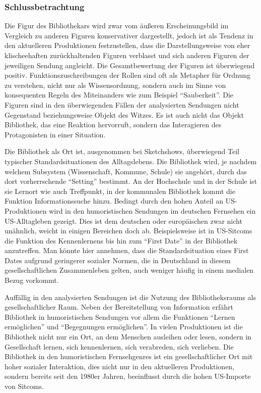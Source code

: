\subsubsection{Schlussbetrachtung}\label{schlussbetrachtung}

Die Figur des Bibliothekars wird zwar vom äußeren Erscheinungsbild im
Vergleich zu anderen Figuren konservativer dargestellt, jedoch ist als
Tendenz in den aktuelleren Produktionen festzustellen, dass die
Darstellungsweise von eher klischeehaften zurückhaltenden Figuren
verblasst und sich anderen Figuren der jeweiligen Sendung angleicht. Die
Gesamtbewertung der Figuren ist überwiegend positiv.
Funktionszuschreibungen der Rollen sind oft als Metapher für Ordnung zu
verstehen, nicht nur als Wissensordnung, sondern auch im Sinne von
konsequenten Regeln des Miteinanders wie zum Beispiel
\enquote{Sauberkeit}. Die Figuren sind in den überwiegenden Fällen der
analysierten Sendungen nicht Gegenstand beziehungsweise Objekt des
Witzes. Es ist auch nicht das Objekt Bibliothek, das eine Reaktion
hervorruft, sondern das Interagieren des Protagonisten in einer
Situation.

Die Bibliothek als Ort ist, ausgenommen bei Sketchshows, überwiegend
Teil typischer Standardsituationen des Alltagslebens. Die Bibliothek
wird, je nachdem welchem Subsystem (Wissenschaft, Kommune, Schule) sie
angehört, durch das dort vorherrschende \enquote{Setting} bestimmt. An
der Hochschule und in der Schule ist sie Lernort wie auch Treffpunkt, in
der kommunalen Bibliothek kommt die Funktion Informationssuche hinzu.
Bedingt durch den hohen Anteil an US-Produktionen wird in den
humoristischen Sendungen im deutschen Fernsehen ein US-Alltagleben
gezeigt. Dies ist dem deutschen oder europäischen zwar nicht unähnlich,
weicht in einigen Bereichen doch ab. Beispielsweise ist in US-Sitcoms
die Funktion des Kennenlernens bis hin zum \enquote{First Date} in der
Bibliothek anzutreffen. Man könnte hier annehmen, dass die
Standardsituation eines First Dates aufgrund geringerer
sozialer Normen, die in Deutschland in diesem gesellschaftlichen
Zusammenleben gelten, auch weniger häufig in einem medialen Bezug
vorkommt.

Auffällig in den analysierten Sendungen ist die Nutzung des
Bibliotheksraums als gesellschaftlicher Raum. Neben der Bereitstellung
von Information erfährt Bibliothek in humoristischen Sendungen vor allem
die Funktionen \enquote{Lernen ermöglichen} und \enquote{Begegnungen
ermöglichen}. In vielen Produktionen ist die Bibliothek nicht nur ein
Ort, an dem Menschen ausleihen oder lesen, sondern in Gesellschaft
lernen, sich kennenlernen, sich verabreden, sich verlieben. Die
Bibliothek in den humoristischen Fernsehgenres ist ein
gesellschaftlicher Ort mit hoher sozialer Interaktion, dies nicht nur in
den aktuelleren Produktionen, sondern bereits seit den 1980er Jahren,
beeinflusst durch die hohen US-Importe von Sitcoms.

